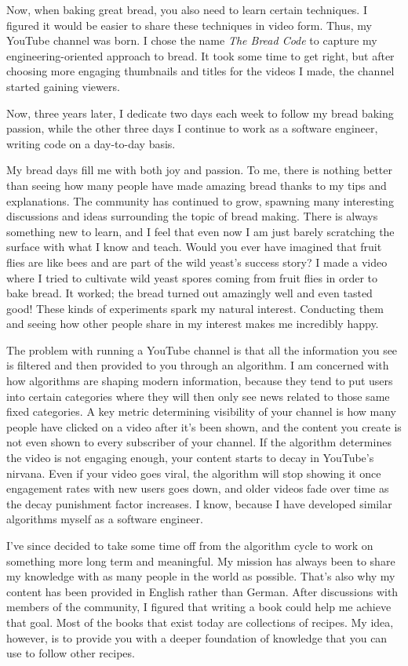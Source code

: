 Now, when baking great bread, you also need to learn certain techniques. I figured it would be
easier to share these techniques in video form. Thus, my YouTube channel was born. I chose
the name {\it The Bread Code} to capture my engineering-oriented approach to bread. It took some
time to get right, but after choosing more engaging thumbnails and titles for
the videos I made, the channel started gaining viewers.

Now, three years later, I dedicate two days each week to follow my bread baking passion, while
the other three days I continue to work as a software engineer, writing code on a day-to-day
basis.

My bread days fill me with both joy and passion. To me, there is nothing better than seeing
how many people have made amazing bread thanks to my tips and explanations. The community has
continued to grow, spawning many interesting discussions and ideas surrounding the topic of
bread making. There is always something new to learn, and I feel that even now I am just barely
scratching the surface with what I know and teach. Would you ever have imagined that fruit
flies are like bees and are part of the wild yeast's success story? I made a video where
I tried to cultivate wild yeast spores coming from fruit flies in order
to bake bread. It worked; the bread turned out amazingly well and even tasted good! These kinds of
experiments spark my natural interest. Conducting them and seeing how other people share in my
interest makes me incredibly happy.

The problem with running a YouTube channel is that all the information
you see is filtered and then provided to you through an algorithm. I am concerned
with how algorithms are shaping modern information, because they tend to
put users into certain categories where they will then only see news related to
those same fixed categories. A key metric determining visibility of your channel is how many
people have clicked on a video after it's been shown, and the content you create
is not even shown to every subscriber of your channel. If the algorithm determines the video
is not engaging enough, your content starts to decay in YouTube's nirvana. Even if your video
goes viral, the algorithm will stop showing it once engagement rates with new users goes down,
and older videos fade over time as the decay punishment factor increases. I know, because
I have developed similar algorithms myself as a software engineer.

I've since decided to take some time off from the algorithm cycle to work on something more
long term and meaningful. My mission has always been to share my knowledge with as many people
in the world as possible. That's also why my content has been provided in English rather than
German. After discussions with members of the community, I figured that writing a book could
help me achieve that goal. Most of the books that exist today are collections of recipes. My
idea, however, is to provide you with a deeper foundation of knowledge that you can use to
follow other recipes.

